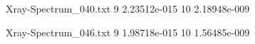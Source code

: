 \documentclass{article}
\begin{document}
\begin{filecontents*}{Xray-Spectrum_040.txt}
9 2.23512e-015
10 2.18948e-009
\end{filecontents*}

\begin{filecontents*}{Xray-Spectrum_046.txt}
9 1.98718e-015
10 1.56485e-009
\end{filecontents*}

\end{document}
